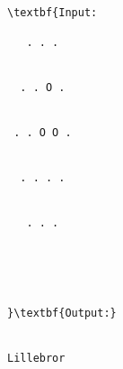 \begin{verbatim}
\textbf{Input:

   . . .


  . . O .


 . . O O .


  . . . .


   . . .





}\textbf{Output:}


Lillebror\end{verbatim}